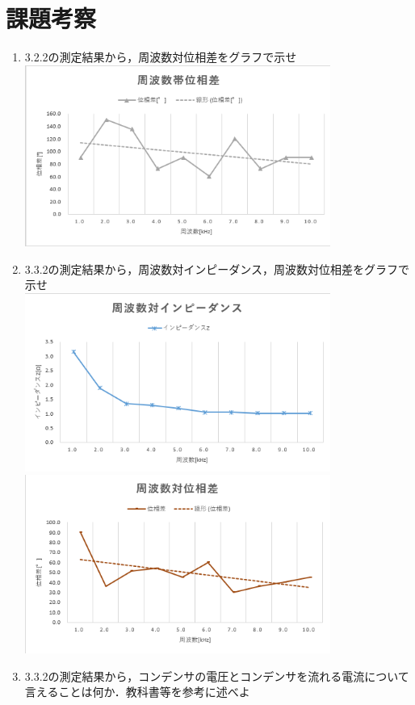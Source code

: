 \documentclass[titlepage]{jarticle}
\begin{document}
\section{課題考察}
\begin{enumerate}
    \item 3.2.2の測定結果から，周波数対位相差をグラフで示せ\\
          \includegraphics[width=10cm]{graph/1.png}\\
    \item 3.3.2の測定結果から，周波数対インピーダンス，周波数対位相差をグラフで示せ\\
          \includegraphics[width=10cm]{graph/2.png}\\
          \includegraphics[width=10cm]{graph/3.png}\\
    \item 3.3.2の測定結果から，コンデンサの電圧とコンデンサを流れる電流について言えることは何か．教科書等を参考に述べよ\\

\end{enumerate}
\end{document}
